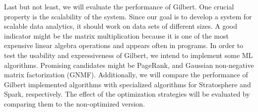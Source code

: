 Last but not least, we will evaluate the performance of Gilbert.
One crucial property is the scalability of the system.
Since our goal is to develop a system for scalable data analytics, it should work on data sets of different sizes.
A good indicator might be the matrix multiplication because it is one of the most expensive linear algebra operations and appears often in programs.
In order to test the usability and expressiveness of Gilbert, we intend to implement some ML algorithms.
Promising candidates might be PageRank, \kmeans and Gaussian non-negative matrix factorization (GNMF).
Additionally, we will compare the performance of Gilbert implemented algorithms with specialized algorithms for Stratosphere and Spark, respectively.
The effect of the optimization strategies will be evaluated by comparing them to the non-optimized version.